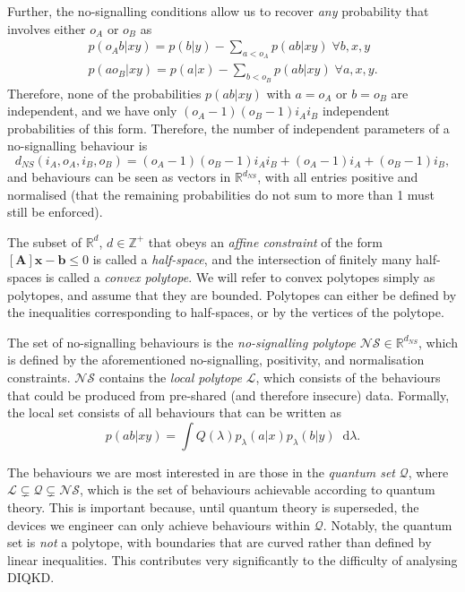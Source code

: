 \documentclass[10pt, a4paper]{article}
\numberwithin{equation}{section} %
\theoremstyle{definition}
\theoremstyle{plain}
\newcommand{\dif}{\mathop{}\!\mathrm{d}} %
\newcommand{\?}{\mathrel{?}} %
\newcommand{\Z}{\mathbb{Z}} %
\newcommand{\R}{\mathbb{R}} %
\newcommand{\cvec}[1]{\boldsymbol{\mathbf{#1}}}    %
\newcommand{\matr}[1]{\left[\mathbf{#1}\right]} %
\newcommand{\Ls}{\mathcal{L}}
\newcommand{\Qs}{\mathcal{Q}}
\newcommand{\NSs}{\mathcal{NS}}
\begin{document}
  Further, the no-signalling conditions allow us to recover \emph{any} probability that involves either \(o_A\) or \(o_B\) as
  \begin{gather*}
    p(o_A b|xy) = p(b|y) - \sum_{a < o_A} p(ab|xy)\;\forall b,x,y \\
    p(ao_B|xy) = p(a|x) - \sum_{b < o_B} p(ab|xy)\;\forall a,x,y.
  \end{gather*}
  Therefore, none of the probabilities \(p(ab|xy)\) with \(a = o_A\) or \(b = o_B\) are independent, and we have only \((o_A-1)(o_B-1){i_A}{i_B}\) independent probabilities of this form. Therefore, the number of independent parameters of a no-signalling behaviour is
  \[ d_{NS}(i_A, o_A, i_B, o_B) = (o_A-1)(o_B-1){i_A}{i_B} + (o_A-1)i_A + (o_B-1)i_B, \]
  and behaviours can be seen as vectors in \(\R^{d_{NS}}\), with all entries positive and normalised (that the remaining probabilities do not sum to more than 1 must still be enforced).

  The subset of \(\R^d\), \(d \in \Z^+\) that obeys an \emph{affine constraint} of the form \(\matr{A}\cvec{x} - \cvec{b} \leq 0\) is called a \emph{half-space}, and the intersection of finitely many half-spaces is called a \emph{convex polytope}. We will refer to convex polytopes simply as polytopes, and assume that they are bounded. Polytopes can either be defined by the inequalities corresponding to half-spaces, or by the vertices of the polytope.

  The set of no-signalling behaviours is the \emph{no-signalling polytope} \(\NSs \in \R^{d_{NS}}\), which is defined by the aforementioned no-signalling, positivity, and normalisation constraints. \(\NSs\) contains the \emph{local polytope} \(\Ls\), which consists of the behaviours that could be produced from pre-shared (and therefore insecure) data. Formally, the local set consists of all behaviours that can be written as 
  \begin{equation}\label{eqn:localdef}
    p(ab|xy) = \int Q(\lambda) p_{\lambda}(a|x)p_{\lambda}(b|y) \dif{\lambda}.
  \end{equation}

  The behaviours we are most interested in are those in the \emph{quantum set} \(\Qs\), where \(\Ls \subsetneq \Qs \subsetneq \NSs\), which is the set of behaviours achievable according to quantum theory. This is important because, until quantum theory is superseded, the devices we engineer can only achieve behaviours within \(\Qs\). Notably, the quantum set is \emph{not} a polytope, with boundaries that are curved rather than defined by linear inequalities. This contributes very significantly to the difficulty of analysing DIQKD.\@
\end{document}
